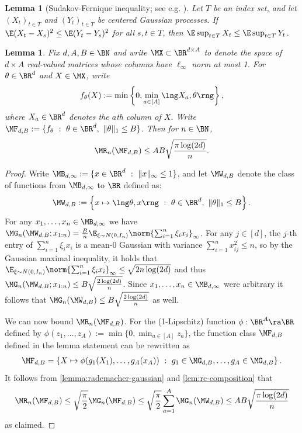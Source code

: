 \documentclass[11pt, oneside]{article}
\theoremstyle{plain}
\newtheorem{lemma}[theorem]{Lemma}
\theoremstyle{definition}
\numberwithin{theorem}{section}
\renewcommand{\^}[1]{^{(#1)}}
\begin{document}
\begin{lemma}[Sudakov-Fernique inequality; see e.g. {\cite[Theorem 2.2.3]{adler2007random}}]\label{lemma:sf-ineq}
Let $T$ be an index set, and let $(X_t)_{t \in T}$ and $(Y_t)_{t \in T}$ be centered Gaussian processes. If $\E(X_t - X_s)^2 \leq \E(Y_t - Y_s)^2$ for all $s,t \in T$, then $\E \sup_{t\in T} X_t \leq \E \sup_{t \in T} Y_t$.
\end{lemma}

\begin{lemma}
  \label{lem:min-feature-rc}
  Fix $d, A, B \in \BN$ and write $\MX \subset \BR^{d \times A}$ to denote the space of $d \times A$ real-valued matrices whose columns have $\ell_\infty$ norm at most 1. For $\theta \in \BR^d$ and $X \in \MX$, write
  \begin{align}
f_\theta(X) := \min \left\{0, \min_{a \in [A]} \lng X_a, \theta \rng \right\}\nonumber,
  \end{align}
  where $X_a \in \BR^d$ denotes the $a$th column of $X$. Write $\MF_{d,B} := \{ f_\theta \ : \ \theta \in \BR^d,\ \| \theta \|_1 \leq B \}$. Then for $n \in \BN$,
  \begin{align}
\MR_n(\MF_{d,B}) \leq AB \sqrt{\frac{\pi \log (2d)}{n}} \nonumber.
  \end{align}
\end{lemma}
\begin{proof}
  Write $\MB_{d, \infty} := \{ x \in \BR^d \ : \ \| x \|_\infty \leq 1\}$, and let $\MW_{d,B}$ denote the class of functions from $\MB_{d, \infty}$ to $\BR$ defined as:
  \begin{align}
\MW_{d,B} := \left\{ x \mapsto \lng \theta, x \rng \ : \ \theta \in \BR^d,\ \| \theta\|_1 \leq B \right\}\nonumber.
  \end{align}
  For any $x_1,\dots,x_n \in \MB_{d,\infty}$ we have $\MG_n(\MW_{d,B}; x_{1:n}) = \frac{B}{n} \E_{\xi \sim N(0,I_n)} \norm{\sum_{i=1}^n \xi_i x_i}_\infty$. For any $j \in [d]$, the $j$-th entry of $\sum_{i=1}^n \xi_i x_i$ is a mean-$0$ Gaussian with variance $\sum_{i=1}^n x_{ij}^2 \leq n$, so by the Gaussian maximal inequality, it holds that $\E_{\xi \sim N(0,I_n)} \norm{\sum_{i=1}^n \xi_i x_i}_\infty \leq \sqrt{2n\log(2d)}$ and thus $\MG_n(\MW_{d,B};x_{1:n}) \leq B \sqrt{\frac{2 \log (2d)}{n}}$. Since $x_1,\dots,x_n \in \MB_{d,\infty}$ were arbitrary it follows that $\MG_n(\MW_{d,B}) \leq B\sqrt{\frac{2\log(2d)}{n}}$ as well. 
  
  We can now bound $\MR_n(\MF_{d,B})$. For the (1-Lipschitz) function $\phi : \BR^A \ra \BR$ defined by $\phi(z_1, \ldots, z_A):= \min\{0, \min_{a \in [A]} z_a \}$, the function class $\MF_{d,B}$ defined in the lemma statement can be rewritten as
  \begin{align}
\MF_{d,B} = \left\{ X \mapsto \phi(g_1(X_1), \ldots, g_A(x_A)) \ : \ g_1 \in \MG_{d,B}, \ldots, g_A \in \MG_{d,B} \right\}\nonumber.
  \end{align}
  It follows from \cref{lemma:rademacher-gaussian} and \cref{lem:rc-composition} that \[\MR_n(\MF_{d,B}) \leq \sqrt{\frac{\pi}{2}} \MG_n(\MF_{d,B}) \leq \sqrt{\frac{\pi}{2}}\sum_{a=1}^A \MG_n(\MW_{d,B}) \leq AB \sqrt{\frac{\pi \log (2d)}{n}}\]
  as claimed.
\end{proof}
\end{document}
